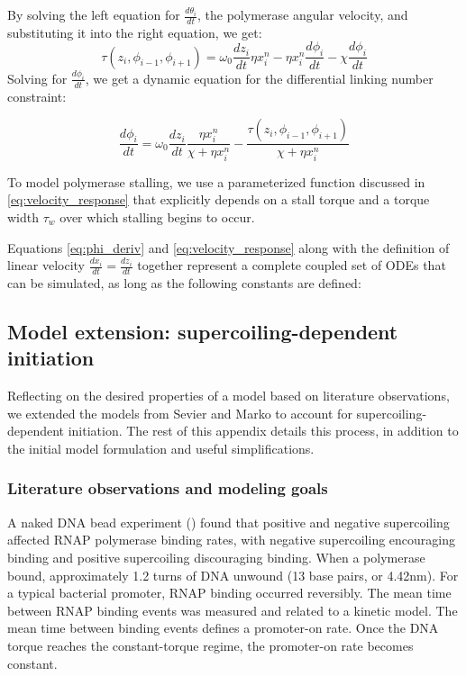 \documentclass[11pt]{article} %
\begin{document}
By solving the left equation for \(\frac{d \theta_i}{dt}\), the polymerase angular velocity, and substituting it into the right equation, we get:
\[\tau(z_i, \phi_{i-1}, \phi_{i+1}) = \omega_0 \frac{dz_i}{dt} \eta x_i^n - \eta x_i^n \frac{d\phi_i}{dt} - \chi \frac{d\phi_i}{dt}\]
Solving for \(\frac{d\phi_i}{dt}\), we get a dynamic equation for the differential linking number constraint:

\begin{equation}
    \frac{d\phi_i}{dt} = \omega_0 \frac{dz_i}{dt} \frac{\eta x_i^n}{\chi + \eta x_i^n} - \frac{\tau(z_i, \phi_{i-1}, \phi_{i+1})}{\chi + \eta x_i^n}
\end{equation} \label{eq:phi_deriv}

To model polymerase stalling, we use a parameterized function discussed in \cref{eq:velocity_response} that explicitly depends on a stall torque and a torque width \(\tau_w\) over which stalling begins to occur.

Equations \ref{eq:phi_deriv} and \ref{eq:velocity_response} along with the definition of linear velocity \(\frac{dx_i}{dt} = \frac{dz_i}{dt}\) together represent a complete coupled set of ODEs that can be simulated, as long as the following constants are defined:


\subsection{Model extension: supercoiling-dependent initiation} \label{sec:sc_initation}
Reflecting on the desired properties of a model based on literature observations, we extended the models from Sevier and Marko to account for supercoiling-dependent initiation. The rest of this appendix details this process, in addition to the initial model formulation and useful simplifications.

\subsubsection{Literature observations and modeling goals}
A naked DNA bead experiment (\textcite{revyakinPromoterUnwindingPromoter2004}) found that positive and negative supercoiling affected RNAP polymerase binding rates, with negative supercoiling encouraging binding and positive supercoiling discouraging binding. When a polymerase bound, approximately 1.2 turns of DNA unwound (13 base pairs, or 4.42nm). For a typical bacterial promoter, RNAP binding occurred reversibly. The mean time between RNAP binding events was measured and related to a kinetic model. The mean time between binding events defines a promoter-on rate. Once the DNA torque reaches the constant-torque regime, the promoter-on rate becomes constant.
\end{document}

